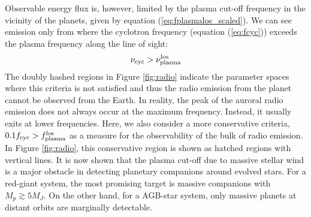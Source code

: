 \documentclass[iop,numberedappendix,apj]{emulateapj}
\def\plotonesc#1{\centering \leavevmode
\texttt{[image: \#1]}}
\begin{document}
Observable energy flux is, however, limited by the plasma cut-off frequency in the vicinity of the planets, given by equation (\ref{eq:fplasmalos_scaled}).
We can see emission only from where the cyclotron frequency (equation (\ref{eq:fcyc})) exceeds the plasma frequency along the line of sight:
\begin{equation}
\label{eq:fcyc>fplasma} \nu_{\rm cyc} > \nu_{\rm plasma}^{\rm los}
\end{equation} 
The doubly hashed regions in Figure \ref{fig:radio} indicate the parameter spaces where this criteria is not satisfied and thus the radio emission from the planet cannot be observed from the Earth. 
In reality, the peak of the auroral radio emission does not always occur at the maximum frequency. Instead, it usually exits at lower frequencies. Here, we also consider a more conservative criteria, $0.1 f_{\rm cyc} > f_{\rm plasma}^{\rm los}$ as a measure for the observability of the bulk of radio emission. In Figure \ref{fig:radio}, this conservative region is shown as hatched regions with vertical lines. 
It is now shown that the plasma cut-off due to massive stellar wind is a major obstacle in detecting planetary companions around evolved stars. 
For a red-giant system, the most promising target is massive companions with $M_p \gtrsim 5M_J$. 
On the other hand, for a AGB-star system, only massive planets at distant orbits are marginally detectable. 


\end{document}
